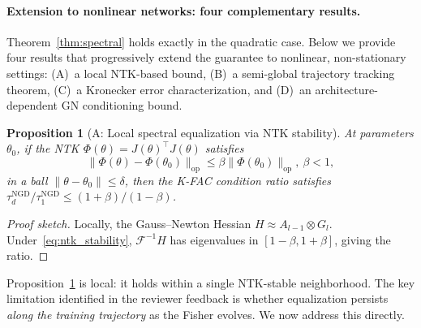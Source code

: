 \documentclass{article}
\providecommand{\FIM}{\mathcal{F}}
\providecommand{\norm}[1]{\lVert #1 \rVert}
\theoremstyle{plain}
\newtheorem{proposition}{Proposition}
\theoremstyle{definition}
\theoremstyle{remark}
\begin{document}
\paragraph{Extension to nonlinear networks: four complementary results.}
Theorem~\ref{thm:spectral} holds exactly in the quadratic case. Below we provide four results that progressively extend the guarantee to nonlinear, non-stationary settings: (A)~a local NTK-based bound, (B)~a semi-global trajectory tracking theorem, (C)~a Kronecker error characterization, and (D)~an architecture-dependent GN conditioning bound.

\begin{proposition}[A: Local spectral equalization via NTK stability]
\label{prop:ntk}
At parameters $\theta_0$, if the NTK $\Phi(\theta) = J(\theta)^\top\! J(\theta)$ satisfies
\begin{equation}
\label{eq:ntk_stability}
    \norm{\Phi(\theta) - \Phi(\theta_0)}_{\mathrm{op}} \leq \beta\norm{\Phi(\theta_0)}_{\mathrm{op}},~ \beta < 1,
\end{equation}
in a ball $\norm{\theta - \theta_0} \leq \delta$, then the K-FAC condition ratio satisfies $\tau_d^{\mathrm{NGD}}/\tau_1^{\mathrm{NGD}} \leq (1+\beta)/(1-\beta)$.
\end{proposition}

\begin{proof}[Proof sketch]
Locally, the Gauss--Newton Hessian $H \approx A_{l-1} \otimes G_l$. Under~\eqref{eq:ntk_stability}, $\FIM^{-1}H$ has eigenvalues in $[1-\beta,1+\beta]$, giving the ratio.
\end{proof}

Proposition~\ref{prop:ntk} is local: it holds within a single NTK-stable neighborhood. The key limitation identified in the reviewer feedback is whether equalization persists \emph{along the training trajectory} as the Fisher evolves. We now address this directly.
\end{document}
